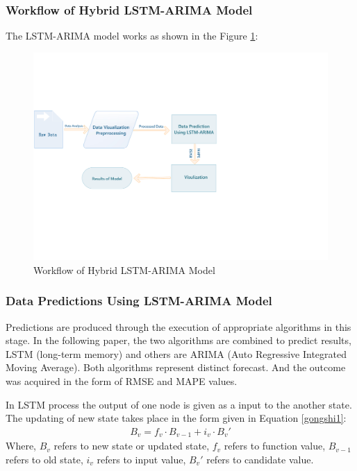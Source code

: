 \documentclass[12pt]{article}  %
\begin{document}
\subsubsection{Workflow of Hybrid LSTM-ARIMA Model}
The LSTM-ARIMA model works as shown in the Figure \ref{yuanli}:
\begin{figure}[htbp]
\centering
\includegraphics[width=\textwidth]{img/document1.pdf}
\caption{Workflow of Hybrid LSTM-ARIMA Model}\label{yuanli}
\end{figure}
\subsubsection{Data Predictions Using LSTM-ARIMA Model}
Predictions are produced through the execution of appropriate algorithms in this stage. In the following paper, the two algorithms are combined to predict results, LSTM (long-term memory) and others are ARIMA (Auto Regressive Integrated Moving Average). Both algorithms represent distinct forecast. And the outcome was acquired in the form of RMSE and MAPE values.

In LSTM process the output of one node is given as a input to the another state. The updating of new state takes place in the form given in Equation \ref{gongshi1}:
\begin{eqnarray}
B_v=f_v\cdot B_{v-1}+i_v\cdot B_v'\label{gongshi1} 
\end{eqnarray}
Where, $B_v$ refers to new state or updated state, $f_v$ refers to function value, $B_{v-1}$ refers to old state, $i_v$ refers to input value, $B_v'$ refers to candidate value.
\end{document}
